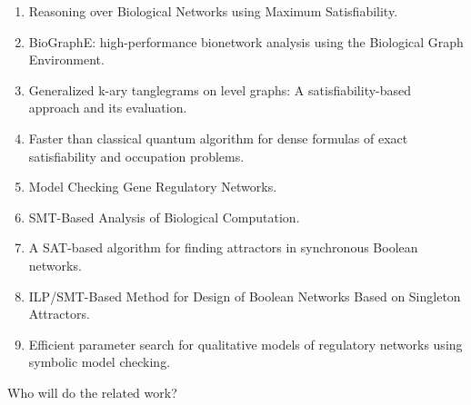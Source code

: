 \begin{enumerate}
\item Reasoning over Biological Networks using Maximum Satisfiability.
\item BioGraphE: high-performance bionetwork analysis using the Biological Graph Environment.
\item Generalized k-ary tanglegrams on level graphs: A satisfiability-based approach and its evaluation.
\item Faster than classical quantum algorithm for dense formulas of exact
satisfiability and occupation problems.
\item Model Checking Gene Regulatory Networks.
\item SMT-Based Analysis of Biological Computation.
\item A SAT-based algorithm for finding attractors in synchronous Boolean networks.
\item ILP/SMT-Based Method for Design of Boolean Networks Based on Singleton Attractors.
\item Efficient parameter search for qualitative models of regulatory networks using symbolic model checking.
\end{enumerate}
Who will do the related work?


